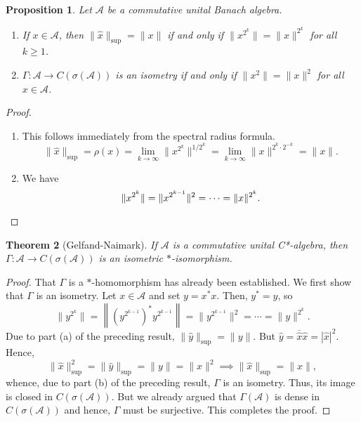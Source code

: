\documentclass[12pt]{article}
\theoremstyle{thmstyle}
\newtheorem{theorem}{Theorem}[section]
\newtheorem{proposition}[theorem]{Proposition}
\theoremstyle{defstyle}
\newcommand{\calA}{\mathcal{A}} %
\newcommand{\wh}[1]{\widehat{#1}}
\renewcommand{\ge}{\geqslant}
\begin{document}
\begin{proposition}
    Let $\calA$ be a commutative unital Banach algebra. 
    \begin{enumerate}[label=(\alph*)]
    \item If $x\in\calA$, then $\|\wh x\|_{\sup} = \|x\|$ if and only if $\|x^{2^k}\| = \|x\|^{2^k}$ for all $k\ge 1$. 
    \item $\Gamma:\calA\to C(\sigma(\calA))$ is an isometry if and only if $\|x^2\| = \|x\|^2$ for all $x\in\calA$.
    \end{enumerate}
\end{proposition}
\begin{proof}
\begin{enumerate}[label=(\alph*)]
    \item This follows immediately from the spectral radius formula. 
    \begin{equation*}
        \|\wh x\|_{\sup} = \rho(x) = \lim_{k\to\infty}\|x^{2^k}\|^{1/2^k} = \lim_{k\to\infty}\|x\|^{2^k\cdot 2^{-k}} = \|x\|.
    \end{equation*}
    \item We have
    \begin{equation*}
        \|x^{2^k}\| = \|x^{2^{k - 1}}\|^2 = \cdots = \|x\|^{2^k}. \qedhere
    \end{equation*}
\end{enumerate}
\end{proof}

\begin{theorem}[Gelfand-Naimark]
    If $\calA$ is a commutative unital C*-algebra, then $\Gamma:\calA\to C(\sigma(\calA))$ is an isometric $\ast$-isomorphism.
\end{theorem}
\begin{proof}
    That $\Gamma$ is a $\ast$-homomorphism has already been established. We first show that $\Gamma$ is an isometry. Let $x\in\calA$ and set $y = x^\ast x$. Then, $y^\ast = y$, so 
    \begin{equation*}
        \|y^{2^k}\| = \left\|\left(y^{2^{k - 1}}\right)^\ast y^{2^{k - 1}}\right\| = \|y^{2^{k - 1}}\|^2 = \cdots = \|y\|^{2^k}.
    \end{equation*}
    Due to part (a) of the preceding result, $\|\wh y\|_{\sup} = \|y\|$. But $\wh y = \overline{\wh x}\wh x = |\wh x|^2$. Hence,
    \begin{equation*}
        \|\wh x\|_{\sup}^2 = \|\wh y\|_{\sup} = \|y\| = \|x\|^2\implies\|\wh x\|_{\sup} = \|x\|,
    \end{equation*}
    whence, due to part (b) of the preceding result, $\Gamma$ is an isometry. Thus, its image is closed in $C(\sigma(\calA))$. But we already argued that $\Gamma(\calA)$ is dense in $C(\sigma(\calA))$ and hence, $\Gamma$ must be surjective. This completes the proof.
\end{proof}
\end{document}
